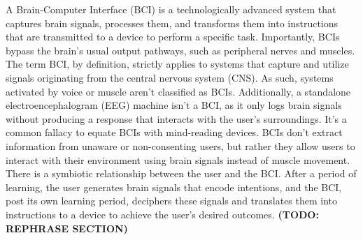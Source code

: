 \vspace*{2mm}
\hspace{\parindent} A Brain-Computer Interface (BCI) is a technologically advanced system that captures brain signals, processes them, and transforms them into instructions that are transmitted to a device to perform a specific task. Importantly, BCIs bypass the brain's usual output pathways, such as peripheral nerves and muscles. The term BCI, by definition, strictly applies to systems that capture and utilize signals originating from the central nervous system (CNS). As such, systems activated by voice or muscle aren't classified as BCIs. Additionally, a standalone electroencephalogram (EEG) machine isn't a BCI, as it only logs brain signals without producing a response that interacts with the user's surroundings. It's a common fallacy to equate BCIs with mind-reading devices. BCIs don't extract information from unaware or non-consenting users, but rather they allow users to interact with their environment using brain signals instead of muscle movement. There is a symbiotic relationship between the user and the BCI. After a period of learning, the user generates brain signals that encode intentions, and the BCI, post its own learning period, deciphers these signals and translates them into instructions to a device to achieve the user's desired outcomes\cite{Shih_2012}. {\bfseries(TODO: REPHRASE SECTION)}